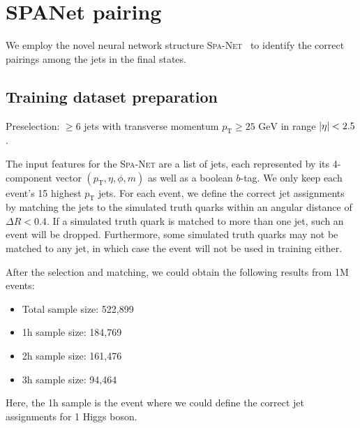 \documentclass[12pt]{article}
\begin{document}
\section{SPANet pairing}%
\label{sec:spanet_pairing}
	We employ the novel neural network structure \textsc{Spa-Net}~\cite{PhysRevD.105.112008, Fenton:2023ikr, 10.21468/SciPostPhys.12.5.178} to identify the correct pairings among the jets in the final states.
	\subsection{Training dataset preparation}%
	\label{sub:training_dataset_preparation}
		Preselection: $\ge 6$ jets with transverse momentum $p_{\text{T}} \ge \text{25 GeV}$ in range $\abs{\eta} < 2.5$.

		The input features for the \textsc{Spa-Net} are a list of jets, each represented by its 4-component vector $(p_\text{T}, \eta, \phi, m)$ as well as a boolean $b$-tag. We only keep each event's 15 highest $p_\text{T}$ jets. For each event, we define the correct jet assignments by matching the jets to the simulated truth quarks within an angular distance of $\Delta R < 0.4$. If a simulated truth quark is matched to more than one jet, such an event will be dropped. Furthermore, some simulated truth quarks may not be matched to any jet, in which case the event will not be used in training either. 

		After the selection and matching, we could obtain the following results from 1M events:
		\begin{itemize}
			\item Total sample size: 522,899
			\item 1h sample size: 184,769
			\item 2h sample size: 161,476
			\item 3h sample size: 94,464
		\end{itemize}
		Here, the 1h sample is the event where we could define the correct jet assignments for 1 Higgs boson. 
\end{document}
